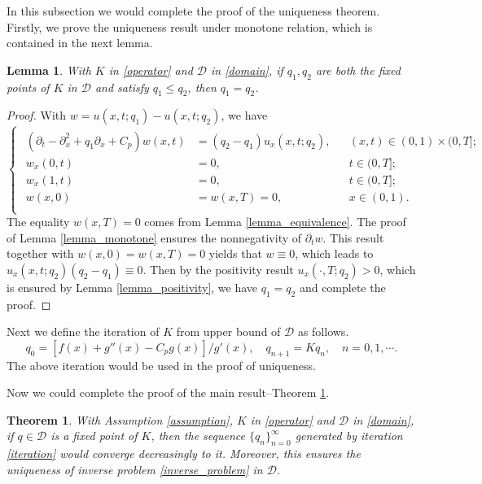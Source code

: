 \documentclass[11pt]{article}
\newtheorem{theorem}{Theorem}[section]
\newtheorem{lemma}{Lemma}[section]
\numberwithin{equation}{section}
\begin{document}
In this subsection we would complete the proof of the uniqueness theorem. Firstly, we prove the uniqueness result under monotone relation, which is contained in the next lemma. \begin{lemma}\label{lemma_uniqueness}
With $K$ in \eqref{operator} and $\mathcal D$ in \eqref{domain}, if $q_1,q_2$ are both the fixed points of $K$ in $\mathcal D$ and satisfy $q_1\le q_2$, then $q_1=q_2$.
\end{lemma}
\begin{proof}
 With $w=u(x,t;q_1)-u(x,t;q_2)$, we have 
 \begin{equation*}
 \begin{cases}
  \begin{aligned}
   (\partial_t-\partial_x^2+q_1\partial_x+C_p)w(x,t)&=(q_2-q_1)u_x(x,t;q_2), &&(x,t)\in(0,1)\times(0,T];\\
   w_x(0,t)&=0,&&t\in(0,T];\\
   w_x(1,t)&=0,&&t\in(0,T];\\
   w(x,0)&=w(x,T)=0,&&x\in(0,1).\\
  \end{aligned}
 \end{cases}
\end{equation*}
The equality $w(x,T)=0$ comes from Lemma \ref{lemma_equivalence}. The proof of Lemma \ref{lemma_monotone} ensures the nonnegativity of $\partial_t w$. This result together with $w(x,0)=w(x,T)=0$ yields that $w\equiv 0$, which leads to $u_x(x,t;q_2)(q_2-q_1)\equiv 0$. Then by the positivity result $u_x(\cdot, T;q_2)>0$, which is ensured by Lemma \ref{lemma_positivity}, we have $q_1=q_2$ and complete the proof. 
\end{proof}

Next we define the iteration of $K$ from upper bound of $\mathcal D$ as follows. 
\begin{equation}\label{iteration}
 q_0=[f(x)+g''(x)-C_pg(x)]/g'(x),\quad q_{n+1}=Kq_n,\quad n=0,1,\cdots.
\end{equation}
The above iteration would be used in the proof of uniqueness. 

Now we could complete the proof of the main result--Theorem \ref{theorem_unique}. 
\begin{theorem}\label{theorem_unique}
 With Assumption \ref{assumption}, $K$ in \eqref{operator} and $\mathcal D$ in \eqref{domain}, if $q\in \mathcal D$ is a fixed point of $K$, then the sequence $\{q_n\}_{n=0}^\infty$ generated by iteration \eqref{iteration} would converge decreasingly to it. Moreover, this ensures the uniqueness of inverse problem \eqref{inverse_problem} in $\mathcal D$. 
\end{theorem}
\end{document}
